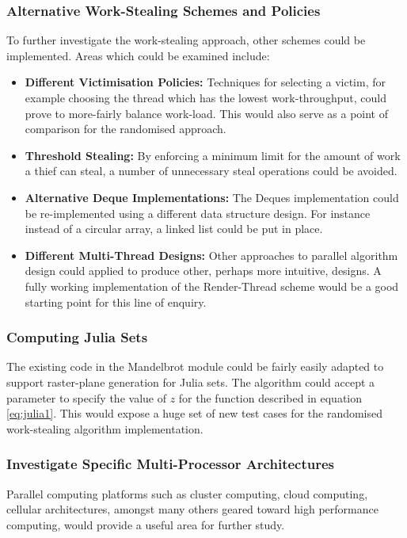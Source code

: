 \subsubsection*{Alternative Work-Stealing Schemes and Policies}
To further investigate the work-stealing approach, other schemes could be implemented. 
Areas which could be examined include:
\begin{itemize}
\item \textbf{Different Victimisation Policies: } 
    Techniques for selecting a victim, for example choosing the thread which has the lowest work-throughput, could 
    prove to more-fairly balance work-load. This would also serve as a point of comparison for the randomised approach.
\item \textbf{Threshold Stealing: }
    By enforcing a minimum limit for the amount of work a thief can steal, a number of unnecessary steal operations could be avoided.
\item \textbf{Alternative Deque Implementations: }
    The Deques implementation could be re-implemented using a different data structure design. For instance instead of a circular array,
    a linked list could be put in place.
\item \textbf{Different Multi-Thread Designs: }
    Other approaches to parallel algorithm design could applied to produce other, perhaps more intuitive, designs.
    A fully working implementation of the Render-Thread scheme would be a good starting point for this line of enquiry.
\end{itemize}

\subsubsection*{Computing Julia Sets}
The existing code in the Mandelbrot module could be fairly easily adapted to support raster-plane generation for Julia sets.
The algorithm could accept a parameter to specify the value of \(z\) for the function described in equation \ref{eq:julia1}.
This would expose a huge set of new test cases for the randomised work-stealing algorithm implementation.

\subsubsection*{Investigate Specific Multi-Processor Architectures}
Parallel computing platforms such as cluster computing, cloud computing, cellular architectures, amongst many others 
geared toward high performance computing, would provide a useful area for further study. 

